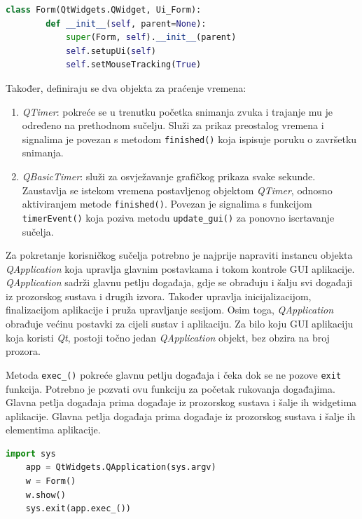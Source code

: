 \begin{lstlisting}[caption={Definicija klase \textit{Form} i njezin konstruktor}, language=Python]
	class Form(QtWidgets.QWidget, Ui_Form):
		def __init__(self, parent=None):
			super(Form, self).__init__(parent)
			self.setupUi(self)
			self.setMouseTracking(True)
\end{lstlisting}

Također, definiraju se dva objekta za praćenje vremena:
\begin{enumerate}
	\item \textit{QTimer}: pokreće se u trenutku početka snimanja zvuka i trajanje mu je određeno na prethodnom sučelju. Služi za prikaz preostalog vremena i signalima je povezan s metodom \lstinline|finished()| koja ispisuje poruku o završetku snimanja.
	\item \textit{QBasicTimer}: služi za osvježavanje grafičkog prikaza svake sekunde. Zaustavlja se istekom vremena postavljenog objektom \textit{QTimer}, odnosno aktiviranjem metode \lstinline|finished()|. Povezan je signalima s funkcijom \lstinline|timerEvent()| koja poziva metodu \lstinline|update_gui()| za ponovno iscrtavanje sučelja.
\end{enumerate}

Za pokretanje korisničkog sučelja potrebno je najprije napraviti instancu objekta \textit{QApplication} koja upravlja glavnim postavkama i tokom kontrole GUI aplikacije. \textit{QApplication} sadrži glavnu petlju događaja, gdje se obrađuju i šalju svi događaji iz prozorskog sustava i drugih izvora. Također upravlja inicijalizacijom, finalizacijom aplikacije i pruža upravljanje sesijom. Osim toga, \textit{QApplication} obrađuje većinu postavki za cijeli sustav i aplikaciju. Za bilo koju GUI aplikaciju koja koristi \textit{Qt}, postoji točno jedan \textit{QApplication} objekt, bez obzira na broj prozora. 

Metoda \lstinline|exec_()| pokreće glavnu petlju događaja i čeka dok se ne pozove \lstinline|exit| funkcija. Potrebno je pozvati ovu funkciju za početak rukovanja događajima. Glavna petlja događaja prima događaje iz prozorskog sustava i šalje ih widgetima aplikacije. Glavna petlja događaja prima događaje iz prozorskog sustava i šalje ih elementima  aplikacije.

\begin{lstlisting}[caption={Naredbe za pokretanje korisničkog sučelja}, language=Python]
	import sys
	app = QtWidgets.QApplication(sys.argv)
	w = Form()
	w.show()
	sys.exit(app.exec_())
\end{lstlisting}


